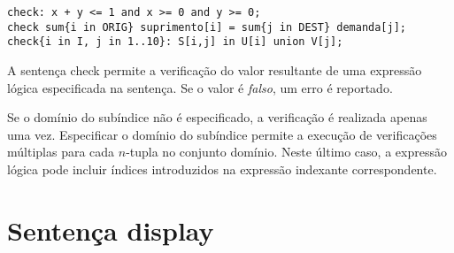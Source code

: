 \documentclass[11pt, brazil]{report}
\def\para#1{\noindent{\bf#1}}
\begin{document}
\para{Exemplos}

\begin{verbatim}
check: x + y <= 1 and x >= 0 and y >= 0;
check sum{i in ORIG} suprimento[i] = sum{j in DEST} demanda[j];
check{i in I, j in 1..10}: S[i,j] in U[i] union V[j];
\end{verbatim}

A sentença check permite a verificação do valor resultante
de uma expressão lógica especificada na sentença. Se o valor
é {\it falso}, um erro é reportado.

Se o domínio do subíndice não é especificado, a verificação é realizada
apenas uma vez. \linebreak Especificar o domínio do subíndice
permite a execução de verificações múltiplas para cada $n$-tupla
no conjunto domínio. Neste último caso, a expressão lógica pode
incluir índices introduzidos na expressão indexante correspondente.


%
%
%
%
%
%
%

\section{Sentença display}

\noindent
{}
\end{document}
